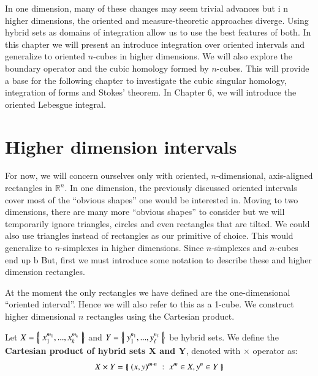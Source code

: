 In one dimension, many of these changes may seem trivial advances but i n higher dimensions, the oriented and measure-theoretic approaches diverge. \cite{tao2007differential}
Using hybrid sets as domains of integration allow us to use the best features of both.
In this chapter we will present an introduce integration over oriented intervals and generalize to oriented $n$-cubes in higher dimensions.
We will also explore the boundary operator and the cubic homology formed by $n$-cubes.
This will provide a base for the following chapter to investigate the cubic singular homology, integration of forms and Stokes' theorem.
In Chapter 6, we will introduce the oriented Lebesgue integral.




%
%

\section{Higher dimension intervals}

For now, we will concern ourselves only with oriented, $n$-dimensional, axis-aligned rectangles in $\mathbb{R}^n$.
In one dimension, the previously discussed oriented intervals cover most of the ``obvious shapes'' one would be interested in.
Moving to two dimensions, there are many more ``obvious shapes'' to consider but we will temporarily ignore triangles, circles and even rectangles that are tilted.
We could also use triangles instead of rectangles as our primitive of choice. 
This would generalize to $n$-simplexes in higher dimensions.
Since $n$-simplexes and $n$-cubes end up b\cite{choquetanalysis}
But, first we must introduce some notation to describe these and higher dimension rectangles. 

At the moment the only rectangles we have defined are the one-dimensional ``oriented interval''.
Hence we will also refer to this as a 1-cube.
We construct higher dimensional $n$ rectangles using the Cartesian product.
\begin{definition}
	Let $X = \left\{ \! \left| \;  x_1^{m_1}, ... , x_k^{m_k}  \; \right| \! \right\}$ and $Y= \left\{ \! \left| \;  y_1^{n_1}, ... , y_\ell^{n_\ell}  \; \right| \! \right\}$ be hybrid sets.
	We define the \textbf{Cartesian product of hybrid sets $\boldsymbol{X}$ and $\boldsymbol{Y}$}, denoted with $\times$ operator as:
	\begin{equation}
		X \times Y = \left\{ \! \left| \;  (x, y)^{m \cdot n} \; : \; x^m \in X, y^n \in Y  \; \right| \! \right\}
	 \end{equation}
\end{definition}

